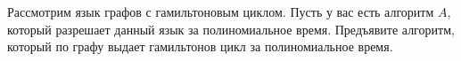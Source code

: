 Рассмотрим язык графов с гамильтоновым циклом. Пусть у вас есть алгоритм $A$, который разрешает данный
язык за полиномиальное время. Предъявите алгоритм, который по графу выдает гамильтонов цикл за
полиномиальное время.
